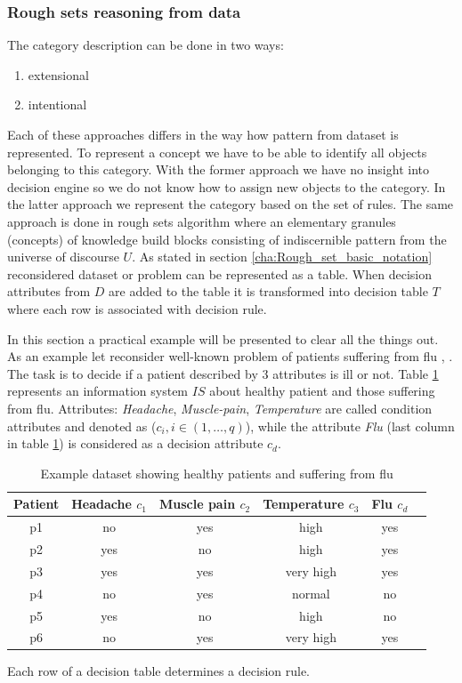 \subsubsection{Rough sets reasoning from data}
The category description can be done in two ways:
\begin{enumerate}
    \item extensional
    \item intentional
\end{enumerate}
Each of these approaches differs in the way how pattern from dataset is
represented. To represent a concept we have to be able to identify all objects belonging 
to this category. With the former approach we have no insight 
into decision engine so we do not know how to assign new objects to the category.
In the latter approach we represent the category based on the set of rules. The same 
approach is done in rough sets algorithm where an elementary 
granules (concepts) of knowledge build blocks consisting 
of indiscernible pattern from the universe of discourse $U$. 
As stated in section \ref{cha:Rough_set_basic_notation} reconsidered dataset or
problem can be represented as a table. When decision attributes from $D$ are
added to the table it is transformed into decision table $T$ where each
row is associated with decision rule.

In this section a practical example will be presented to clear all the things
out. As an example let reconsider well-known problem of patients suffering from
flu \cite{bib39}, \cite{bib40}. The task is to decide if a patient described by 3 attributes is ill or not. Table \ref{tab:example_rough_set} 
represents an information system $IS$ about healthy patient and those suffering
from flu. Attributes: \textit{Headache}, \textit{Muscle-pain},
\textit{Temperature} are called condition attributes and denoted as ($c_i,i \in (1, \ldots, q)$),
while the attribute \textit{Flu} (last column in table \ref{tab:example_rough_set}) is considered as
a decision attribute $c_d$.
\begin{table}[H] 
    \centering
    \caption{Example dataset showing healthy patients and suffering from flu}
    \begin{tabular}{|c|c|c|c|c|c|}
        \hline 
    Patient & Headache $c_1$& Muscle pain $c_2$& Temperature $c_3$& Flu $c_d$\\ \hline \hline
    p1 & no & yes & high & yes \\ \hline
    p2 & yes & no & high & yes \\ \hline
    p3 & yes & yes & very high & yes \\ \hline
    p4 & no & yes & normal & no \\ \hline
    p5 & yes & no & high & no \\ \hline
    p6 & no & yes & very high & yes \\ \hline    
    \end{tabular}
    \label{tab:example_rough_set}
\end{table}
Each row of a decision table determines a decision rule. 


